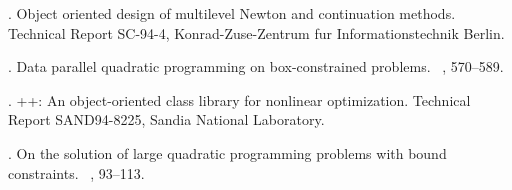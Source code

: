 \documentclass{esub2acm}
\begin{document}
\begin{thebibliography}{}
 .
\newblock Object oriented design of multilevel {N}ewton and continuation
  methods.
\newblock Technical Report SC-94-4, Konrad-Zuse-Zentrum fur Informationstechnik
  Berlin.

 .
\newblock Data parallel quadratic programming on box-constrained problems.
\newblock {}~, 570--589.

 .
++: An object-oriented class library for nonlinear optimization.
\newblock Technical Report SAND94-8225, Sandia National Laboratory.

 .
\newblock On the solution of large quadratic programming problems with bound
  constraints.
\newblock {}~, 93--113.

\end{thebibliography}
\end{document}
